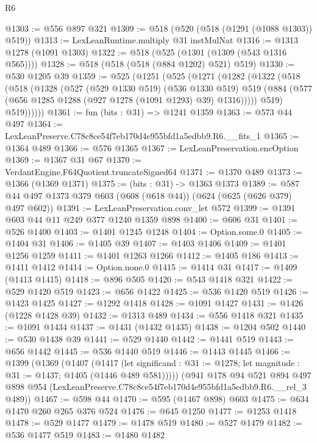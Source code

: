 \begin{lexlean}{R6}
\begin{coremodule}
@1303 := @556 @897 @321
@1309 := @518 (@520 (@518 (@1291 (@1088 @1303)) @519))
@1313 := LexLeanRuntime.multiply @31 instMulNat
@1316 := @1313 @1278 (@1091 @1303)
@1322 := @518 (@525 (@1301 (@1309 (@543 @1316 @565))))
@1328 := @518 (@518 (@518 (@884 @1202) @521) @519)
@1330 := @530 @1205 @39
@1359 := @525
    (@1251
      (@525
        (@1271
          (@1282
            (@1322
              (@518
                (@518
                  (@1328
                    (@527
                      (@529 @1330 @519)
                      (@536 @1330 @519)
                      @519
                      (@884 (@577 (@656 @1285 @1288 (@927 @1278 (@1091 @1293) @39) @1316)))))
                  @519)
                @519))))))
@1361 := fun (bits : @31) => @1241 @1359
@1363 := @573 @44 @497
@1364 := LexLeanPreserve.C78c8ce54f7eb170d4e955bfd1a5edbb9.R6.__fits_1
@1365 := @1364 @489
@1366 := @576 @1365
@1367 := LexLeanPreservation.encOption
@1369 := @1367 @31 @67
@1370 := VerdantEngine.F64Quotient.truncateSigned64
@1371 := @1370 @489
@1373 := @1366 (@1369 @1371)
@1375 := (bits : @31) -> @1363 @1373
@1389 := @587 @44 @497 @1373 @379 @603 (@608 (@618 @44)) (@624 (@625 (@626 @379) @497 @602))
@1391 := LexLeanPreservation.conv_let @572
@1399 := @1391 @603 @44 @11 @249 @377 @1240 @1359 @898
@1400 := @606 @31
@1401 := @526 @1400
@1403 := @1401 @1245 @1248
@1404 := Option.some.{0}
@1405 := @1404 @31
@1406 := @1405 @39
@1407 := @1403 @1406
@1409 := @1401 @1256 @1259
@1411 := @1401 @1263 @1266
@1412 := @1405 @186
@1413 := @1411 @1412
@1414 := Option.none.{0}
@1415 := @1414 @31
@1417 := @1409 (@1413 @1415)
@1418 := @896 @505
@1420 := @543 @1418 @321
@1422 := @529 @1420 @519
@1423 := @656 @1422
@1425 := @536 @1420 @519
@1426 := @1423 @1425
@1427 := @1292 @1418
@1428 := @1091 @1427
@1431 := @1426 (@1228 @1428 @39)
@1432 := @1313 @489
@1434 := @556 @1418 @321
@1435 := @1091 @1434
@1437 := @1431 (@1432 @1435)
@1438 := @1204 @502
@1440 := @530 @1438 @39
@1441 := @529 @1440
@1442 := @1441 @519
@1443 := @656 @1442
@1445 := @536 @1440 @519
@1446 := @1443 @1445
@1466 := @1399
    (@1369
      (@1407
        (@1417
          (let significand : @31 := @1278; let magnitude : @31 := @1437; @1405 (@1446 @489 @581)))))
    (@941
      @178
      @94
      @521
      @894
      @497
      @898
      @954
      (LexLeanPreserve.C78c8ce54f7eb170d4e955bfd1a5edbb9.R6.__rel_3 @489))
@1467 := @598 @44
@1470 := @595 (@1467 @898) @603
@1475 := @634 @1470 @260 @265 @376 @524
@1476 := @645 @1250
@1477 := @1253 @1418
@1478 := @529 @1477
@1479 := @1478 @519
@1480 := @527 @1479
@1482 := @536 @1477 @519
@1483 := @1480 @1482

\end{coremodule}
\end{lexlean}
